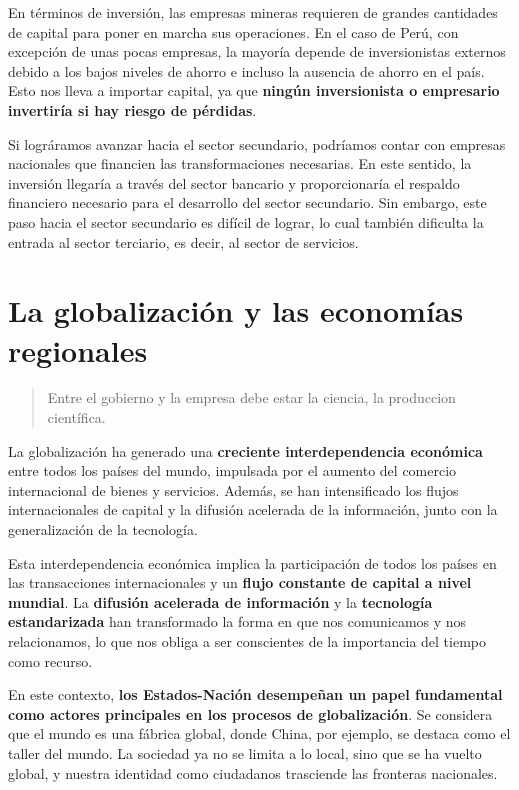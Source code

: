 \documentclass[
  letterpaper,
  DIV=11,
  numbers=noendperiod]{scrartcl}
\begin{document}
En términos de inversión, las empresas mineras requieren de grandes
cantidades de capital para poner en marcha sus operaciones. En el caso
de Perú, con excepción de unas pocas empresas, la mayoría depende de
inversionistas externos debido a los bajos niveles de ahorro e incluso
la ausencia de ahorro en el país. Esto nos lleva a importar capital, ya
que \textbf{ningún inversionista o empresario invertiría si hay riesgo
de pérdidas}.

Si lográramos avanzar hacia el sector secundario, podríamos contar con
empresas nacionales que financien las transformaciones necesarias. En
este sentido, la inversión llegaría a través del sector bancario y
proporcionaría el respaldo financiero necesario para el desarrollo del
sector secundario. Sin embargo, este paso hacia el sector secundario es
difícil de lograr, lo cual también dificulta la entrada al sector
terciario, es decir, al sector de servicios.

\hypertarget{la-globalizaciuxf3n-y-las-economuxedas-regionales}{%
\section{La globalización y las economías
regionales}\label{la-globalizaciuxf3n-y-las-economuxedas-regionales}}

\begin{quote}
Entre el gobierno y la empresa debe estar la ciencia, la produccion
científica.
\end{quote}

La globalización ha generado una \textbf{creciente interdependencia
económica} entre todos los países del mundo, impulsada por el aumento
del comercio internacional de bienes y servicios. Además, se han
intensificado los flujos internacionales de capital y la difusión
acelerada de la información, junto con la generalización de la
tecnología.

Esta interdependencia económica implica la participación de todos los
países en las transacciones internacionales y un \textbf{flujo constante
de capital a nivel mundial}. La \textbf{difusión acelerada de
información} y la \textbf{tecnología estandarizada} han transformado la
forma en que nos comunicamos y nos relacionamos, lo que nos obliga a ser
conscientes de la importancia del tiempo como recurso.

En este contexto, \textbf{los Estados-Nación desempeñan un papel
fundamental como actores principales en los procesos de globalización}.
Se considera que el mundo es una fábrica global, donde China, por
ejemplo, se destaca como el taller del mundo. La sociedad ya no se
limita a lo local, sino que se ha vuelto global, y nuestra identidad
como ciudadanos trasciende las fronteras nacionales.
\end{document}
